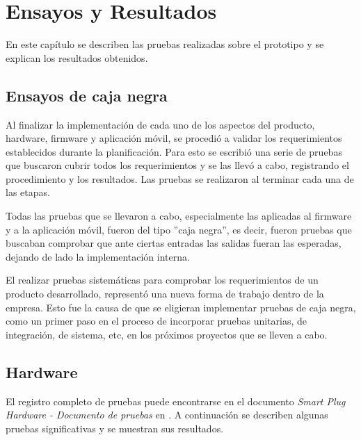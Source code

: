 
\chapter{Ensayos y Resultados} %

\label{Chapter4} %


En este capítulo se describen las pruebas realizadas sobre el prototipo y se explican los resultados obtenidos.

\section{Ensayos de caja negra}

Al finalizar la implementación de cada uno de los aspectos del producto, hardware, firmware y aplicación móvil, se procedió a validar los requerimientos establecidos durante la planificación. Para esto se escribió una serie de pruebas que buscaron cubrir todos los requerimientos y se las llevó a cabo, registrando el procedimiento y los resultados. Las pruebas se realizaron al terminar cada una de las etapas.

Todas las pruebas que se llevaron a cabo, especialmente las aplicadas al firmware y a la aplicación móvil, fueron del tipo ''caja negra'', es decir, fueron pruebas que buscaban comprobar que ante ciertas entradas las salidas fueran las esperadas, dejando de lado la implementación interna.

El realizar pruebas sistemáticas para comprobar los requerimientos de un producto desarrollado, representó una nueva forma de trabajo dentro de la empresa. Esto fue la causa de que se eligieran implementar pruebas de caja negra, como un primer paso en el proceso de incorporar pruebas unitarias, de integración, de sistema, etc, en los próximos proyectos que se lleven a cabo.

\section{Hardware}

El registro completo de pruebas puede encontrarse en el documento \textit{Smart Plug Hardware - Documento de pruebas} en \citep{repo_hardware}. A continuación se describen algunas pruebas significativas y se muestran sus resultados.


